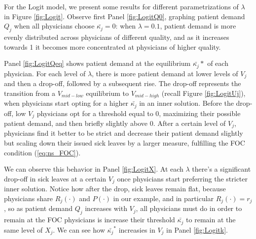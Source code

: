 \documentclass[../main.tex]{subfiles}
\begin{document}
For the Logit model, we present some results for different parametrizations of $\lambda$ in Figure \ref{fig:Logit}. Observe first Panel \ref{fig:LogitQ0}, graphing patient demand $Q_j$ when all physicians choose $\bar{\kappa_j} = 0$: when $\lambda = 0.1$, patient demand is more evenly distributed across physicians of different quality, and as it increases towards 1 it becomes more concentrated at physicians of higher quality.

Panel \ref{fig:LogitQeq} shows patient demand at the equilibrium $\bar{\kappa_j}*$ of each physician. For each level of $\lambda$, there is more patient demand at lower levels of $V_j$ and then a drop-off, followed by a subsequent rise. The drop-off represents the transition from a $V_{mid-low}$ equilibrium to $V_{mid-high}$ (recall Figure \ref{fig:LogitUj}), when physicians start opting for a higher $\bar{\kappa_j}$ in an inner solution. Before the drop-off, low $V_j$ physicians opt for a threshold equal to 0, maximizing their possible patient demand, and then briefly slightly above 0. After a certain level of $V_j$, physicians find it better to be strict and decrease their patient demand slightly but scaling down their issued sick leaves by a larger measure, fulfilling the FOC condition (\ref{eq:ns_FOC}).

We can observe this behavior in Panel \ref{fig:LogitX}. At each $\lambda$ there's a significant drop-off in sick leaves at a certain $V_j$ once physicians start preferring the stricter inner solution. Notice how after the drop, sick leaves remain flat, because physicians share $R_j(\cdot)$ and $P(\cdot)$ in our example, and in particular $R_j(\cdot) = r_j$, so as patient demand $Q_j$ increases with $V_j$, all physicians must do in order to remain at the FOC physicians is increase their threshold $\bar{\kappa_j}$ to remain at the same level of $X_j$. We can see how $\bar{\kappa_j}^*$ increasies in $V_j$ in Panel \ref{fig:Logitk}.
\end{document}
